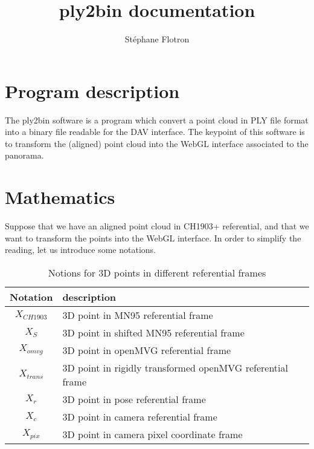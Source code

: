 \documentclass[a4paper, 11pt]{article}
\author{ St\'ephane Flotron }
\title{\textbf{ply2bin documentation}}
\begin{document}
   \maketitle
   
   \section*{Program description}
   
   The ply2bin software is a program which convert a point cloud in PLY file format into 
   a binary file readable for the DAV interface. 
   The keypoint of this software is to transform the (aligned) point cloud into the WebGL
   interface associated to the panorama.
   
   \section*{Mathematics}
   
   Suppose that we have an aligned point cloud in CH1903+ referential, and that we want to transform the points into
   the WebGL interface. In order to simplify the reading, let us introduce some notations. 
   
   \begin{table}[H]
      \begin{center}
        \begin{tabular}{|c|l|}
                \hline 
                    Notation & description \\
                \hline
                    $X_{CH1903}$ & 3D point in MN95 referential frame \\
                    $X_S$       & 3D point in shifted MN95 referential frame \\
                    $X_{omvg}$   & 3D point in openMVG referential frame \\
                    $X_{trans}$ & 3D point in rigidly transformed openMVG referential frame \\
                    $X_r$       & 3D point in pose referential frame \\
                    $X_c$       & 3D point in camera referential frame \\
                    $X_{pix}$   & 3D point in camera pixel coordinate frame \\
                \hline
        \end{tabular}
      \end{center}
      \label{3D point notation}
      \caption{Notions for 3D points in different referential frames}
   \end{table}
   
\end{document}
